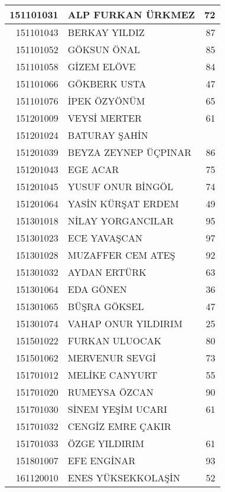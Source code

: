 \documentclass[12pt]{article}
\begin{document}
\begin{multicols}{2}
\begin{longtable}{||r||l||r||}
    \midrule
    151101031 & ALP FURKAN ÜRKMEZ & \cellcolor[rgb]{ 1,  1,  0} 72 \\
    \midrule
    151101043 & BERKAY YILDIZ & 87 \\
    \midrule
    151101052 & GÖKSUN ÖNAL & 85 \\
    \midrule
    151101058 & GİZEM ELÖVE & 84 \\
    \midrule
    151101066 & GÖKBERK USTA & 47 \\
    \midrule
    151101076 & İPEK ÖZYÖNÜM & 65 \\
    \midrule
    151201009 & VEYSİ MERTER & 61 \\
    \midrule
    151201024 & BATURAY ŞAHİN &  \\
    \midrule
    151201039 & BEYZA ZEYNEP ÜÇPINAR & 86 \\
    \midrule
    151201043 & EGE ACAR & 75 \\
    \midrule
    151201045 & YUSUF ONUR BİNGÖL & 74 \\
    \midrule
    151201064 & YASİN KÜRŞAT ERDEM & 49 \\
    \midrule
    151301018 & NİLAY YORGANCILAR & 95 \\
    \midrule
    151301023 & ECE YAVAŞCAN & 97 \\
    \midrule
    151301028 & MUZAFFER CEM ATEŞ & 92 \\
    \midrule
    151301032 & AYDAN ERTÜRK & 63 \\
    \midrule
    151301064 & EDA GÖNEN & 36 \\
    \midrule
    151301065 & BÜŞRA GÖKSEL & \cellcolor[rgb]{ 1,  1,  0} 47 \\
    \midrule
    151301074 & VAHAP ONUR YILDIRIM & 25 \\
    \midrule
    151501022 & FURKAN ULUOCAK & 80 \\
    \midrule
    151501062 & MERVENUR SEVGİ & 73 \\
    \midrule
    151701012 & MELİKE CANYURT & 55 \\
    \midrule
    151701020 & RUMEYSA ÖZCAN & 90 \\
    \midrule
    151701030 & SİNEM YEŞİM UCARI & 61 \\
    \midrule
    151701032 & CENGİZ EMRE ÇAKIR &  \\
    \midrule
    151701033 & ÖZGE YILDIRIM & 61 \\
    \midrule
    151801007 & EFE ENGİNAR & 93 \\
    \midrule
    161120010 & ENES YÜKSEKKOLAŞİN & 52 \\

\end{longtable}
\end{multicols}
\end{document}
